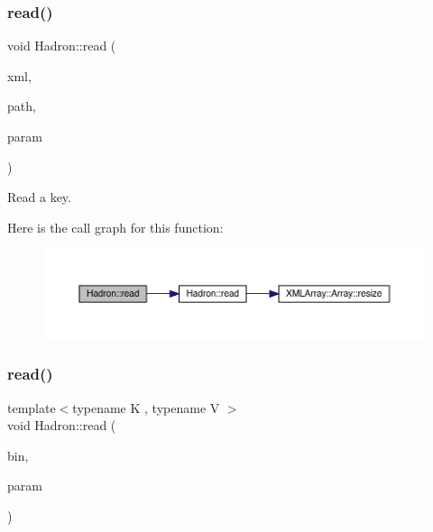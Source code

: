 \subsubsection{\texorpdfstring{read()}{read()}\hspace{0.1cm}{\footnotesize\ttfamily [27/94]}}
{\footnotesize\ttfamily void Hadron\+::read (\begin{DoxyParamCaption}\item[{\mbox{\hyperlink{classADATXML_1_1XMLReader}{X\+M\+L\+Reader}} \&}]{xml,  }\item[{const std\+::string \&}]{path,  }\item[{\mbox{\hyperlink{structHadron_1_1KeyGlueElementalOperator__t}{Key\+Glue\+Elemental\+Operator\+\_\+t}} \&}]{param }\end{DoxyParamCaption})}



Read a key. 

Here is the call graph for this function\+:
\nopagebreak
\begin{figure}[H]
\begin{center}
\leavevmode
\includegraphics[width=350pt]{d1/daf/namespaceHadron_a0651834c5f37836ea0e1e081b4214546_cgraph}
\end{center}
\end{figure}
\mbox{\label{namespaceHadron_a28b215f1b16c66c9862495bf8c11084f}} 
\subsubsection{\texorpdfstring{read()}{read()}\hspace{0.1cm}{\footnotesize\ttfamily [28/94]}}
{\footnotesize\ttfamily template$<$typename K , typename V $>$ \\
void Hadron\+::read (\begin{DoxyParamCaption}\item[{\mbox{\hyperlink{classADATIO_1_1BinaryReader}{Binary\+Reader}} \&}]{bin,  }\item[{\mbox{\hyperlink{structHadron_1_1CGCReturnType}{C\+G\+C\+Return\+Type}}$<$ K, V $>$ \&}]{param }\end{DoxyParamCaption})\hspace{0.3cm}{\ttfamily [inline]}}



